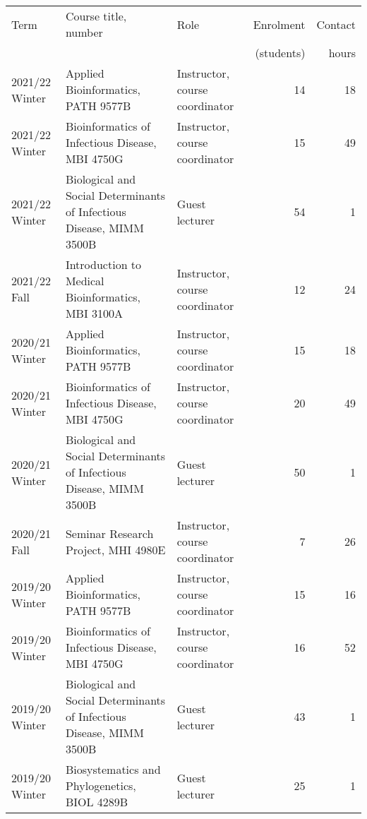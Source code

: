 \bgroup
\setlength{\tabcolsep}{6pt}
\def\arraystretch{1.3}%
\begin{tabular}{lp{2.35in}p{1.2in}rr}
Term & Course title, number & Role & Enrolment & Contact\\[-3pt]
  &  &  &  (students) & hours \\
\hline

2021/22 Winter & Applied Bioinformatics, PATH 9577B & Instructor, course coordinator & 14 & 18\\
2021/22 Winter & Bioinformatics of Infectious Disease, MBI 4750G & Instructor, course coordinator & 15 & 49\\
2021/22 Winter & Biological and Social Determinants of Infectious Disease, MIMM 3500B & Guest lecturer & 54 & 1\\
2021/22 Fall & Introduction to Medical Bioinformatics, MBI 3100A & Instructor, course coordinator & 12 & 24\\

2020/21 Winter & Applied Bioinformatics, PATH 9577B & Instructor, course coordinator & 15 & 18\\
2020/21 Winter & Bioinformatics of Infectious Disease, MBI 4750G & Instructor, course coordinator & 20 & 49\\
2020/21 Winter & Biological and Social Determinants of Infectious Disease, MIMM 3500B & Guest lecturer & 50 & 1\\
2020/21 Fall & Seminar Research Project, MHI 4980E & Instructor, course coordinator & 7 & 26\\


2019/20 Winter & Applied Bioinformatics, PATH 9577B & Instructor, course coordinator & 15 & 16\\
2019/20 Winter & Bioinformatics of Infectious Disease, MBI 4750G & Instructor, course coordinator & 16 & 52\\
2019/20 Winter & Biological and Social Determinants of Infectious Disease, MIMM 3500B & Guest lecturer & 43 & 1\\
2019/20 Winter & Biosystematics and Phylogenetics, BIOL 4289B & Guest lecturer & 25 & 1\\

\hline

\end{tabular}
\egroup